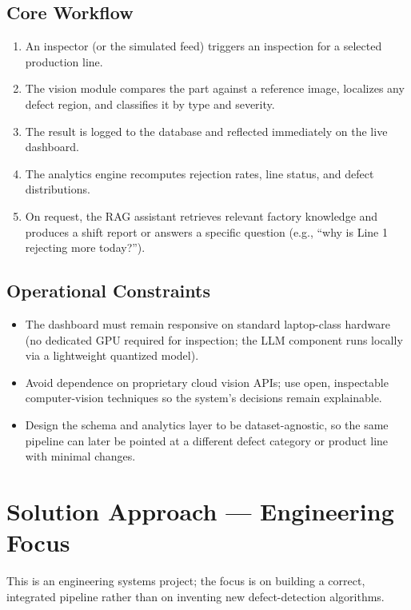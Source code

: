 \documentclass[11pt]{article}
\begin{document}
\subsection{Core Workflow}
\begin{enumerate}[leftmargin=*]
    \item An inspector (or the simulated feed) triggers an inspection for a selected production line.
    \item The vision module compares the part against a reference image, localizes any defect region,
    and classifies it by type and severity.
    \item The result is logged to the database and reflected immediately on the live dashboard.
    \item The analytics engine recomputes rejection rates, line status, and defect distributions.
    \item On request, the RAG assistant retrieves relevant factory knowledge and produces a shift
    report or answers a specific question (e.g., ``why is Line 1 rejecting more today?'').
\end{enumerate}

\subsection{Operational Constraints}
\begin{itemize}[leftmargin=*]
    \item The dashboard must remain responsive on standard laptop-class hardware (no dedicated GPU
    required for inspection; the LLM component runs locally via a lightweight quantized model).
    \item Avoid dependence on proprietary cloud vision APIs; use open, inspectable computer-vision
    techniques so the system's decisions remain explainable.
    \item Design the schema and analytics layer to be dataset-agnostic, so the same pipeline can
    later be pointed at a different defect category or product line with minimal changes.
\end{itemize}

\section{Solution Approach --- Engineering Focus}
This is an engineering systems project; the focus is on building a correct, integrated pipeline
rather than on inventing new defect-detection algorithms.
\end{document}
